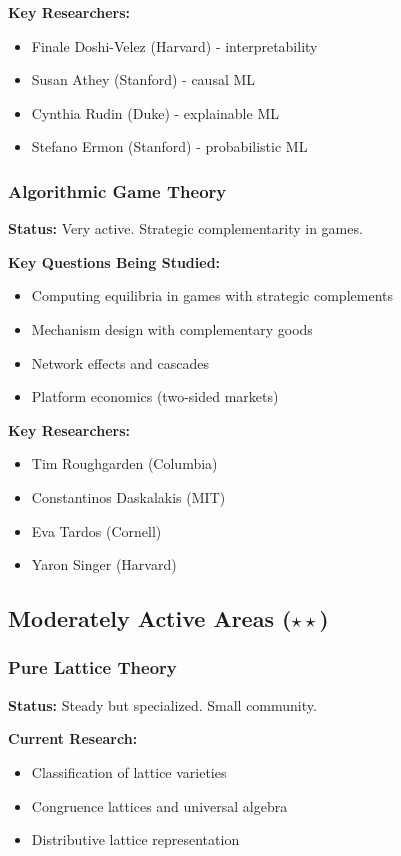 \textbf{Key Researchers:}
\begin{itemize}[noitemsep]
    \item Finale Doshi-Velez (Harvard) - interpretability
    \item Susan Athey (Stanford) - causal ML
    \item Cynthia Rudin (Duke) - explainable ML
    \item Stefano Ermon (Stanford) - probabilistic ML
\end{itemize}

\subsubsection{Algorithmic Game Theory}

\textbf{Status:} Very active. Strategic complementarity in games.

\textbf{Key Questions Being Studied:}
\begin{itemize}[noitemsep]
    \item Computing equilibria in games with strategic complements
    \item Mechanism design with complementary goods
    \item Network effects and cascades
    \item Platform economics (two-sided markets)
\end{itemize}

\textbf{Key Researchers:}
\begin{itemize}[noitemsep]
    \item Tim Roughgarden (Columbia)
    \item Constantinos Daskalakis (MIT)
    \item Eva Tardos (Cornell)
    \item Yaron Singer (Harvard)
\end{itemize}

\subsection{Moderately Active Areas ($\star\star$)}

\subsubsection{Pure Lattice Theory}

\textbf{Status:} Steady but specialized. Small community.

\textbf{Current Research:}
\begin{itemize}[noitemsep]
    \item Classification of lattice varieties
    \item Congruence lattices and universal algebra
    \item Distributive lattice representation
\end{itemize}


